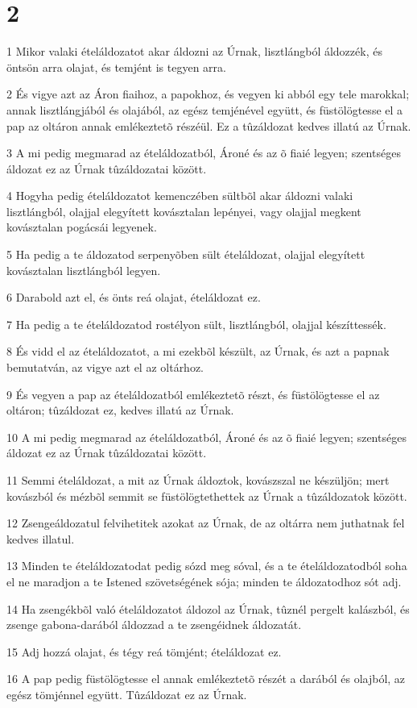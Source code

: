\chapter{2}

\par 1 Mikor valaki ételáldozatot akar áldozni az Úrnak, lisztlángból áldozzék, és öntsön arra olajat, és temjént is tegyen arra.
\par 2 És vigye azt az Áron fiaihoz, a papokhoz, és vegyen ki abból egy tele marokkal; annak lisztlángjából és olajából, az egész temjénével együtt, és füstölögtesse el a pap az oltáron annak emlékeztetõ részéül. Ez a tûzáldozat kedves illatú az Úrnak.
\par 3 A mi pedig megmarad az ételáldozatból, Ároné és az õ fiaié legyen; szentséges áldozat ez az Úrnak tûzáldozatai között.
\par 4 Hogyha pedig ételáldozatot kemenczében sültbõl akar áldozni valaki lisztlángból, olajjal elegyített kovásztalan lepényei, vagy olajjal megkent kovásztalan pogácsái legyenek.
\par 5 Ha pedig a te áldozatod serpenyõben sült ételáldozat, olajjal elegyített kovásztalan lisztlángból legyen.
\par 6 Darabold azt el, és önts reá olajat, ételáldozat ez.
\par 7 Ha pedig a te ételáldozatod rostélyon sült, lisztlángból, olajjal készíttessék.
\par 8 És vidd el az ételáldozatot, a mi ezekbõl készült, az Úrnak, és azt a papnak bemutatván, az vigye azt el az oltárhoz.
\par 9 És vegyen a pap az ételáldozatból emlékeztetõ részt, és füstölögtesse el az oltáron; tûzáldozat ez, kedves illatú az Úrnak.
\par 10 A mi pedig megmarad az ételáldozatból, Ároné és az õ fiaié legyen; szentséges áldozat ez az Úrnak tûzáldozatai között.
\par 11 Semmi ételáldozat, a mit az Úrnak áldoztok, kovászszal ne készüljön; mert kovászból és mézbõl semmit se füstölögtethettek az Úrnak a tûzáldozatok között.
\par 12 Zsengeáldozatul felvihetitek azokat az Úrnak, de az oltárra nem juthatnak fel kedves illatul.
\par 13 Minden te ételáldozatodat pedig sózd meg sóval, és a te ételáldozatodból soha el ne maradjon a te Istened szövetségének sója; minden te áldozatodhoz sót adj.
\par 14 Ha zsengékbõl való ételáldozatot áldozol az Úrnak, tûznél pergelt kalászból, és zsenge gabona-darából áldozzad a te zsengéidnek áldozatát.
\par 15 Adj hozzá olajat, és tégy reá tömjént; ételáldozat ez.
\par 16 A pap pedig füstölögtesse el annak emlékeztetõ részét a darából és olajból, az egész tömjénnel együtt. Tûzáldozat ez az Úrnak.

